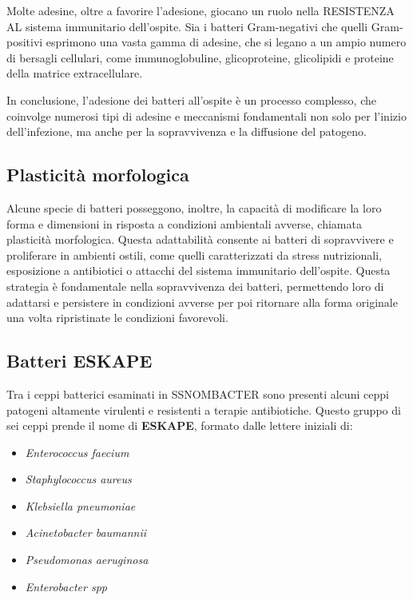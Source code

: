 \documentclass[../main.tex]{subfiles}
\begin{document}
Molte adesine, oltre a favorire l'adesione, giocano un ruolo nella RESISTENZA AL sistema immunitario dell'ospite. Sia i batteri Gram-negativi che quelli Gram-positivi esprimono una vasta gamma di adesine, che si legano a un ampio numero di bersagli cellulari, come immunoglobuline, glicoproteine, glicolipidi e proteine della matrice extracellulare.\cite{finlay_1997}

In conclusione, l'adesione dei batteri all'ospite è un processo complesso, che coinvolge numerosi tipi di adesine e meccanismi fondamentali non solo per l'inizio dell'infezione, ma anche per la sopravvivenza e la diffusione del patogeno.

\subsection{Plasticità morfologica}

Alcune specie di batteri posseggono, inoltre, la capacità di modificare la loro forma e dimensioni in risposta a condizioni ambientali avverse, chiamata plasticità morfologica. Questa adattabilità consente ai batteri di sopravvivere e proliferare in ambienti ostili, come quelli caratterizzati da stress nutrizionali, esposizione a antibiotici o attacchi del sistema immunitario dell'ospite. Questa strategia è fondamentale nella sopravvivenza dei batteri, permettendo loro di adattarsi e persistere in condizioni avverse per poi ritornare alla forma originale una volta ripristinate le condizioni favorevoli.\cite{justice_2008}

\subsection{Batteri ESKAPE}

Tra i ceppi batterici esaminati in SSNOMBACTER sono presenti alcuni ceppi patogeni altamente virulenti e resistenti a terapie antibiotiche. Questo gruppo di sei ceppi prende il nome di \textbf{ESKAPE}, formato dalle lettere iniziali di:

\begin{itemize}
	\itemsep0em
	\item \textit{Enterococcus faecium}
	\item \textit{Staphylococcus aureus}
	\item \textit{Klebsiella pneumoniae}
	\item \textit{Acinetobacter baumannii}
	\item \textit{Pseudomonas aeruginosa}
	\item \textit{Enterobacter spp}
\end{itemize}
\end{document}
